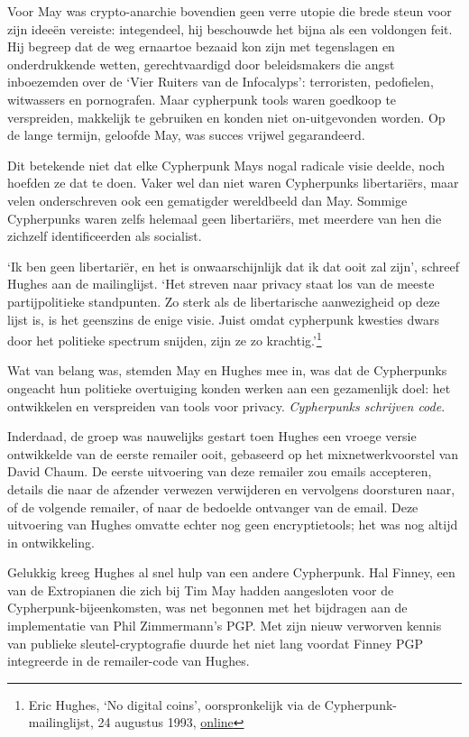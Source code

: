 \documentclass[smalldemyvopaper,11pt,twoside,onecolumn,openright,extrafontsizes,hidelinks]{memoir}
\begin{document}
Voor May was crypto-anarchie bovendien geen verre utopie die brede steun
voor zijn ideeën vereiste: integendeel, hij beschouwde het bijna als een
voldongen feit. Hij begreep dat de weg ernaartoe bezaaid kon zijn met
tegenslagen en onderdrukkende wetten, gerechtvaardigd door beleidsmakers
die angst inboezemden over de `Vier Ruiters van de Infocalyps':
terroristen, pedofielen, witwassers en pornografen. Maar cypherpunk
tools waren goedkoop te verspreiden, makkelijk te gebruiken en konden
niet on-uitgevonden worden. Op de lange termijn, geloofde May, was
succes vrijwel gegarandeerd.

Dit betekende niet dat elke Cypherpunk Mays nogal radicale visie deelde,
noch hoefden ze dat te doen. Vaker wel dan niet waren Cypherpunks
libertariërs, maar velen onderschreven ook een gematigder wereldbeeld
dan May. Sommige Cypherpunks waren zelfs helemaal geen libertariërs, met
meerdere van hen die zichzelf identificeerden als socialist.

`Ik ben geen libertariër, en het is onwaarschijnlijk dat ik dat ooit zal
zijn', schreef Hughes aan de mailinglijst. `Het streven naar privacy
staat los van de meeste partijpolitieke standpunten. Zo sterk als de
libertarische aanwezigheid op deze lijst is, is het geenszins de enige
visie. Juist omdat cypherpunk kwesties dwars door het politieke spectrum
snijden, zijn ze zo krachtig.'\footnote{Eric Hughes, `No digital coins',
  oorspronkelijk via de Cypherpunk-mailinglijst, 24 augustus 1993,
  \href{https://cypherpunks.venona.com/date/1993/08/msg00690.html}{online}}

Wat van belang was, stemden May en Hughes mee in, was dat de Cypherpunks
ongeacht hun politieke overtuiging konden werken aan een gezamenlijk
doel: het ontwikkelen en verspreiden van tools voor privacy.
\emph{Cypherpunks schrijven code}.

Inderdaad, de groep was nauwelijks gestart toen Hughes een vroege versie
ontwikkelde van de eerste remailer ooit, gebaseerd op het
mixnetwerkvoorstel van David Chaum. De eerste uitvoering van deze
remailer zou emails accepteren, details die naar de afzender verwezen
verwijderen en vervolgens doorsturen naar, of de volgende remailer, of
naar de bedoelde ontvanger van de email. Deze uitvoering van Hughes
omvatte echter nog geen encryptietools; het was nog altijd in
ontwikkeling.

Gelukkig kreeg Hughes al snel hulp van een andere Cypherpunk. Hal
Finney, een van de Extropianen die zich bij Tim May hadden aangesloten
voor de Cypherpunk-bijeenkomsten, was net begonnen met het bijdragen aan
de implementatie van Phil Zimmermann's PGP. Met zijn nieuw verworven
kennis van publieke sleutel-cryptografie duurde het niet lang voordat
Finney PGP integreerde in de remailer-code van Hughes.
\end{document}
